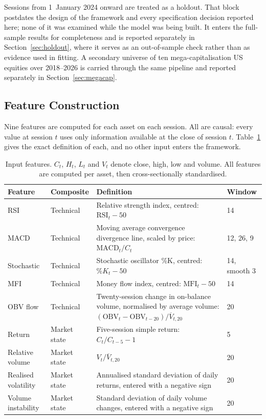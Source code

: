 Sessions from 1~January 2024 onward are treated as a holdout. That block postdates
the design of the framework and every specification decision reported here; none of
it was examined while the model was being built. It enters the full-sample results
for completeness and is reported separately in Section~\ref{sec:holdout}, where it
serves as an out-of-sample check rather than as evidence used in fitting. A secondary
universe of ten mega-capitalisation US equities over 2018--2026 is carried through the
same pipeline and reported separately in Section~\ref{sec:megacap}.

\subsection{Feature Construction}

Nine features are computed for each asset on each session. All are causal: every value
at session $t$ uses only information available at the close of session $t$. Table~\ref{tab:features}
gives the exact definition of each, and no other input enters the framework.

\begin{table}[!ht]
\centering
\caption{Input features. $C_t$, $H_t$, $L_t$ and $V_t$ denote close, high, low and
volume. All features are computed per asset, then cross-sectionally standardised.}
\label{tab:features}
\small
\begin{tabular}{p{2.0cm}p{1.8cm}p{5.2cm}p{1.5cm}}
\hline
\textbf{Feature} & \textbf{Composite} & \textbf{Definition} & \textbf{Window} \\
\hline
RSI & Technical & Relative strength index, centred: $\mathrm{RSI}_t - 50$ & 14 \\
\hline
MACD & Technical & Moving average convergence divergence line, scaled by price: $\mathrm{MACD}_t / C_t$ & 12, 26, 9 \\
\hline
Stochastic & Technical & Stochastic oscillator \%K, centred: $\%K_t - 50$ & 14, smooth 3 \\
\hline
MFI & Technical & Money flow index, centred: $\mathrm{MFI}_t - 50$ & 14 \\
\hline
OBV flow & Technical & Twenty-session change in on-balance volume, normalised by average volume: $(\mathrm{OBV}_t - \mathrm{OBV}_{t-20}) / \overline{V}_{t,20}$ & 20 \\
\hline
Return & Market state & Five-session simple return: $C_t / C_{t-5} - 1$ & 5 \\
\hline
Relative volume & Market state & $V_t / \overline{V}_{t,20}$ & 20 \\
\hline
Realised volatility & Market state & Annualised standard deviation of daily returns, entered with a negative sign & 20 \\
\hline
Volume instability & Market state & Standard deviation of daily volume changes, entered with a negative sign & 20 \\
\hline
\end{tabular}
\end{table}


